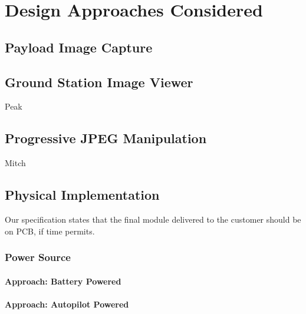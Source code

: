 \chapter{Design Approaches Considered}

\section{Payload Image Capture}










\section{Ground Station Image Viewer}
Peak

\section{Progressive JPEG Manipulation}
Mitch

\section{Physical Implementation}

Our specification states that the final module delivered to the customer 
should be on PCB, if time permits. 
	
\subsection{Power Source}

\subsubsection{Approach: Battery Powered}

\subsubsection{Approach: Autopilot Powered}

